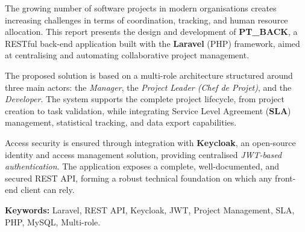 \begin{mdframed}[linecolor=emsiRed, linewidth=1.5pt, backgroundcolor=emsiGray, innertopmargin=12pt, innerbottommargin=12pt, innerleftmargin=15pt, innerrightmargin=15pt]
The growing number of software projects in modern organisations creates increasing challenges
in terms of coordination, tracking, and human resource allocation. This report presents
the design and development of \textbf{PT\_BACK}, a RESTful back-end application built with
the \textbf{Laravel} (PHP) framework, aimed at centralising and automating collaborative
project management.

\vspace{0.4cm}

The proposed solution is based on a multi-role architecture structured around three main actors:
the \textit{Manager}, the \textit{Project Leader (Chef de Projet)}, and the \textit{Developer}.
The system supports the complete project lifecycle, from project creation to task validation,
while integrating Service Level Agreement (\textbf{SLA}) management, statistical tracking,
and data export capabilities.

\vspace{0.4cm}

Access security is ensured through integration with \textbf{Keycloak}, an open-source identity
and access management solution, providing centralised \textit{JWT-based authentication}.
The application exposes a complete, well-documented, and secured REST API, forming
a robust technical foundation on which any front-end client can rely.
\end{mdframed}

\vspace{0.5cm}
\noindent\textbf{Keywords:} Laravel, REST API, Keycloak, JWT, Project Management, SLA, PHP, MySQL, Multi-role.
